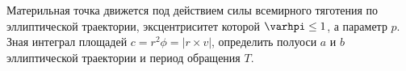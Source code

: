 Материльная точка движется под действием силы всемирного тяготения по эллиптической траектории, эксцентриситет которой
$\varhpi\leq1$, а параметр $p$. Зная интеграл площадей $c=r^2\phi=|r\times v|$, определить полуоси $a$ и $b$ эллиптической 
траектории и период обращения $T$.
